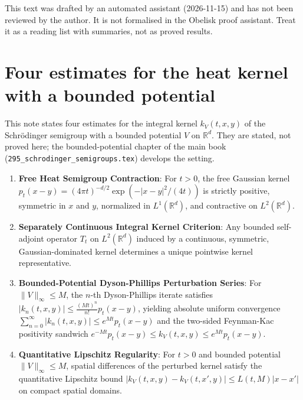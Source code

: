 \def\mypath{../}
\def\topic{Heat kernel estimates for bounded potentials}

\begin{note}
This text was drafted by an automated assistant (2026-11-15) and has not been reviewed by the author.
It is not formalised in the Obelisk proof assistant. Treat it as a reading list with summaries, not as
proved results.
\end{note}

\section{Four estimates for the heat kernel with a bounded potential}
\label{sec:schrodinger_kernel_estimates}

This note states four estimates for the integral kernel $k_V(t,x,y)$ of the Schr\"odinger semigroup with a bounded potential $V$ on $\mathbb{R}^d$. They are stated, not proved here; the bounded-potential chapter of the main book (\texttt{295\_schrodinger\_semigroups.tex}) develops the setting.
\begin{enumerate}
  \item \textbf{Free Heat Semigroup Contraction}: For $t>0$, the free Gaussian kernel $p_t(x-y) = (4\pi t)^{-d/2}\exp(-|x-y|^2/(4t))$ is strictly positive, symmetric in $x$ and $y$, normalized in $L^1(\mathbb{R}^d)$, and contractive on $L^2(\mathbb{R}^d)$.
  \item \textbf{Separately Continuous Integral Kernel Criterion}: Any bounded self-adjoint operator $T_t$ on $L^2(\mathbb{R}^d)$ induced by a continuous, symmetric, Gaussian-dominated kernel determines a unique pointwise kernel representative.
  \item \textbf{Bounded-Potential Dyson-Phillips Perturbation Series}: For $\|V\|_\infty \leq M$, the $n$-th Dyson-Phillips iterate satisfies $|k_n(t,x,y)| \leq \frac{(Mt)^n}{n!}p_t(x-y)$, yielding absolute uniform convergence $\sum_{n=0}^\infty |k_n(t,x,y)| \leq e^{Mt}p_t(x-y)$ and the two-sided Feynman-Kac positivity sandwich $e^{-Mt}p_t(x-y) \leq k_V(t,x,y) \leq e^{Mt}p_t(x-y)$.
  \item \textbf{Quantitative Lipschitz Regularity}: For $t>0$ and bounded potential $\|V\|_\infty \leq M$, spatial differences of the perturbed kernel satisfy the quantitative Lipschitz bound $|k_V(t,x,y) - k_V(t,x',y)| \leq L(t,M)|x-x'|$ on compact spatial domains.
\end{enumerate}


